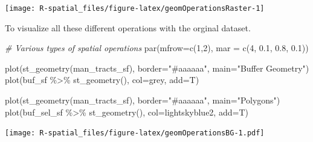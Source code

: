 \documentclass[
  11pt,
]{book}
\newenvironment{Shaded}{\begin{snugshade}}{\end{snugshade}}
\newcommand{\AttributeTok}[1]{\textcolor[rgb]{0.77,0.63,0.00}{#1}}
\newcommand{\CommentTok}[1]{\textcolor[rgb]{0.56,0.35,0.01}{\textit{#1}}}
\newcommand{\DecValTok}[1]{\textcolor[rgb]{0.00,0.00,0.81}{#1}}
\newcommand{\FloatTok}[1]{\textcolor[rgb]{0.00,0.00,0.81}{#1}}
\newcommand{\FunctionTok}[1]{\textcolor[rgb]{0.00,0.00,0.00}{#1}}
\newcommand{\NormalTok}[1]{#1}
\newcommand{\SpecialCharTok}[1]{\textcolor[rgb]{0.00,0.00,0.00}{#1}}
\newcommand{\StringTok}[1]{\textcolor[rgb]{0.31,0.60,0.02}{#1}}
\begin{document}
\texttt{[image: R-spatial\_files/figure-latex/geomOperationsRaster-1]}

To visualize all these different operations with the orginal dataset.

\begin{Shaded}
\begin{Highlighting}[]
\CommentTok{\# Various types of spatial operations}
\FunctionTok{par}\NormalTok{(}\AttributeTok{mfrow=}\FunctionTok{c}\NormalTok{(}\DecValTok{1}\NormalTok{,}\DecValTok{2}\NormalTok{), }\AttributeTok{mar =} \FunctionTok{c}\NormalTok{(}\DecValTok{4}\NormalTok{, }\FloatTok{0.1}\NormalTok{, }\FloatTok{0.8}\NormalTok{, }\FloatTok{0.1}\NormalTok{))}

\FunctionTok{plot}\NormalTok{(}\FunctionTok{st\_geometry}\NormalTok{(man\_tracts\_sf), }\AttributeTok{border=}\StringTok{"\#aaaaaa"}\NormalTok{, }\AttributeTok{main=}\StringTok{"Buffer Geometry"}\NormalTok{)}
\FunctionTok{plot}\NormalTok{(buf\_sf }\SpecialCharTok{\%\textgreater{}\%} \FunctionTok{st\_geometry}\NormalTok{(), }
     \AttributeTok{col=}\StringTok{\textquotesingle{}grey\textquotesingle{}}\NormalTok{, }
     \AttributeTok{add=}\NormalTok{T)}

\FunctionTok{plot}\NormalTok{(}\FunctionTok{st\_geometry}\NormalTok{(man\_tracts\_sf), }\AttributeTok{border=}\StringTok{"\#aaaaaa"}\NormalTok{, }\AttributeTok{main=}\StringTok{"Polygons"}\NormalTok{)}
\FunctionTok{plot}\NormalTok{(buf\_sel\_sf  }\SpecialCharTok{\%\textgreater{}\%} \FunctionTok{st\_geometry}\NormalTok{(), }
     \AttributeTok{col=}\StringTok{\textquotesingle{}lightskyblue2\textquotesingle{}}\NormalTok{, }
     \AttributeTok{add=}\NormalTok{T)}
\end{Highlighting}
\end{Shaded}

\texttt{[image: R-spatial\_files/figure-latex/geomOperationsBG-1.pdf]}
\end{document}
